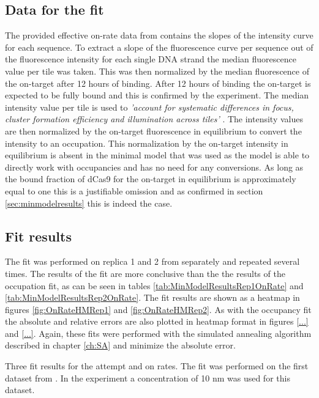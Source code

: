 \subsection{Data for the fit}
\label{sec:DetailsDataOnRate}
The provided effective on-rate data from \cite{PNAS} contains the slopes of the intensity curve for each sequence. To extract a slope of the fluorescence curve per sequence out of the fluorescence intensity for each single DNA strand the median fluorescence value per tile was taken. This was then normalized by the median fluorescence of the on-target after 12 hours of binding. After 12 hours of binding the on-target is expected to be fully bound and this is confirmed by the experiment. The median intensity value per tile is used to \textit{'account for systematic differences in focus, cluster formation efficiency and illumination across tiles'} \citep{PNAS}. The intensity values are then normalized by the on-target fluorescence in equilibrium to convert the intensity to an occupation. This normalization by the on-target intensity in equilibrium is absent in the minimal model that was used as the model is able to directly work with occupancies and has no need for any conversions. As long as the bound fraction of dCas9 for the on-target in equilibrium is approximately equal to one this is a justifiable omission and as confirmed in section \ref{sec:minmodelresults} this is indeed the case.

\subsection{Fit results}
The fit was performed on replica 1 and 2 from \citep{PNAS} separately and repeated several times. The results of the fit are more conclusive than the the results of the occupation fit, as can be seen in tables \ref{tab:MinModelResultsRep1OnRate} and \ref{tab:MinModelResultsRep2OnRate}. The fit results are shown as a heatmap in figures \ref{fig:OnRateHMRep1} and \ref{fig:OnRateHMRep2}. As with the occupancy fit the absolute and relative errors are also plotted in heatmap format in figures \ref{...} and \ref{...}. Again, these fits were performed with the simulated annealing algorithm described in chapter \ref{ch:SA} and minimize the absolute error.


\begin{table}
\begin{center}
\caption{Three fit results for the attempt and on rates. The fit was performed on the first dataset from \cite{PNAS}. In the experiment a concentration of 10 nm was used for this dataset. }
\label{tab:MinModelResultsRep1OnRate}
\end{center}
\end{table}

